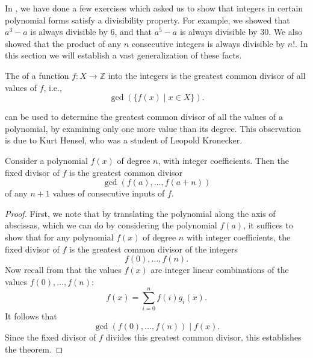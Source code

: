 In , we have done a few exercises which asked us to show that integers in certain polynomial forms satisfy a divisibility property. For example, we showed that $a^3-a$ is always divisible by $6$, and that $a^5-a$ is always divisible by $30$. We also showed that the product of any $n$ consecutive integers is always divisible by $n!$. In this section we will establish a vast generalization of these facts.

\begin{definition}\label{definition:fixed-divisor}
  The  of a function $f:X\to \mathbb{Z}$ into the integers is the greatest common divisor of all values of $f$, i.e.,
  \begin{equation*}
    \gcd(\{f(x)\mid x\in X\}).
  \end{equation*}
\end{definition}

 can be used to determine the greatest common divisor of all the values of a polynomial, by examining only one more value than its degree. This observation is due to Kurt Hensel, who was a student of Leopold Kronecker.

\begin{theorem}\label{theorem:hensels-fixed-divisor-theorem}
  Consider a polynomial $f(x)$ of degree $n$, with integer coefficients. Then the fixed divisor of $f$ is the greatest common divisor
  \begin{equation*}
    \gcd(f(a),\ldots,f(a+n))
  \end{equation*}
  of any $n+1$ values of consecutive inputs of $f$.
\end{theorem}

\begin{proof}
  First, we note that by translating the polynomial along the axis of abscissas, which we can do by considering the polynomial $f(a)$, it suffices to show that for any polynomial $f(x)$ of degree $n$ with integer coefficients, the fixed divisor of $f$ is the greatest common divisor of the integers
  \begin{equation*}
    f(0),\ldots,f(n).
  \end{equation*}
  Now recall from  that the values $f(x)$ are integer linear combinations of the values $f(0),\ldots,f(n)$:
  \begin{equation*}
    f(x)=\sum_{i=0}^nf(i)g_i(x).
  \end{equation*}
  It follows that
  \begin{equation*}
    \gcd(f(0),\ldots,f(n))\mid f(x).
  \end{equation*}
  Since the fixed divisor of $f$ divides this greatest common divisor, this establishes the theorem.
\end{proof}


